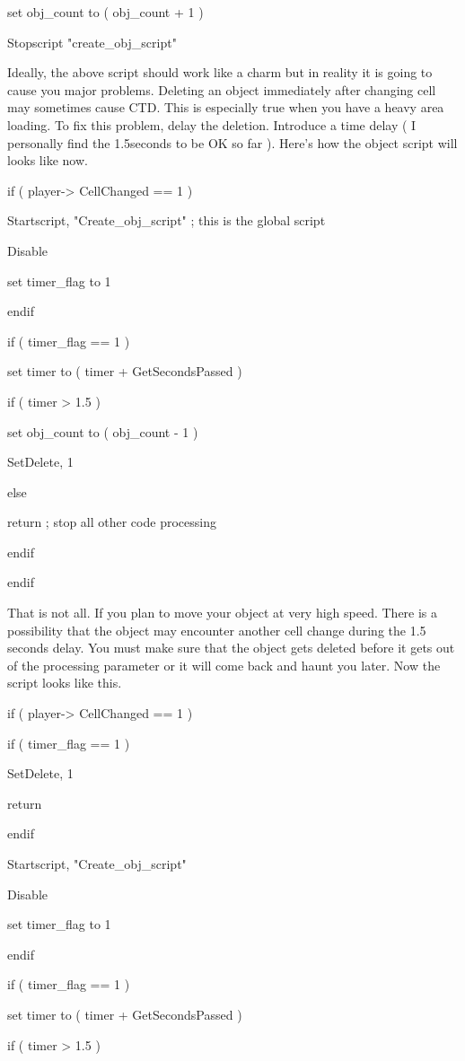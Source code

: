 set obj\_count to ( obj\_count + 1 )

Stopscript "create\_obj\_script"

Ideally, the above script should work like a charm but in reality it is
going to cause you major problems. Deleting an object immediately after
changing cell may sometimes cause CTD. This is especially true when you
have a heavy area loading. To fix this problem, delay the deletion.
Introduce a time delay ( I personally find the 1.5seconds to be OK so
far ). Here's how the object script will looks like now.

if ( player-> CellChanged == 1 )

Startscript, "Create\_obj\_script" ; this is the global script

Disable

set timer\_flag to 1

endif

if ( timer\_flag == 1 )

set timer to ( timer + GetSecondsPassed )

if ( timer > 1.5 )

set obj\_count to ( obj\_count - 1 )

SetDelete, 1

else

return ; stop all other code processing

endif

endif

That is not all. If you plan to move your object at very high speed.
There is a possibility that the object may encounter another cell change
during the 1.5 seconds delay. You must make sure that the object gets
deleted before it gets out of the processing parameter or it will come
back and haunt you later. Now the script looks like this.

if ( player-> CellChanged == 1 )

if ( timer\_flag == 1 )

SetDelete, 1

return

endif

Startscript, "Create\_obj\_script"

Disable

set timer\_flag to 1

endif

if ( timer\_flag == 1 )

set timer to ( timer + GetSecondsPassed )

if ( timer > 1.5 )

